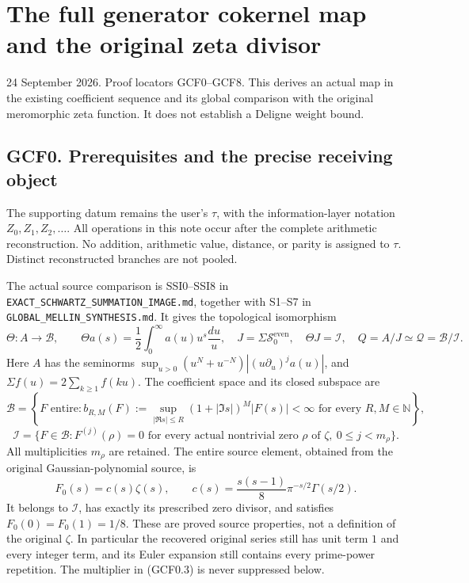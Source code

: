 \section{The full generator cokernel map and the original zeta
divisor}\label{the-full-generator-cokernel-map-and-the-original-zeta-divisor}

24 September 2026. Proof locators GCF0--GCF8. This derives an actual map
in the existing coefficient sequence and its global comparison with the
original meromorphic zeta function. It does not establish a Deligne
weight bound.

\subsection{GCF0. Prerequisites and the precise receiving
object}\label{gcf0.-prerequisites-and-the-precise-receiving-object}

The supporting datum remains the user's \(\tau\), with the
information-layer notation \(Z_0,Z_1,Z_2,\ldots\). All operations in
this note occur after the complete arithmetic reconstruction. No
addition, arithmetic value, distance, or parity is assigned to \(\tau\).
Distinct reconstructed branches are not pooled.

The actual source comparison is SSI0--SSI8 in
\nolinkurl{EXACT_SCHWARTZ_SUMMATION_IMAGE.md}, together with S1--S7 in
\texttt{GLOBAL\_MELLIN\_SYNTHESIS.md}. It gives the topological
isomorphism \[
\Theta:A\longrightarrow\mathcal B,\qquad
\Theta a(s)=\frac12\int_0^\infty a(u)u^s\frac{du}{u},
\quad J=\Sigma\mathcal S_0^{\mathrm{even}},\quad
\Theta J=\mathcal I,\quad Q=A/J\simeq\mathcal Q=\mathcal B/\mathcal I.
\tag{GCF0.1}
\] Here \(A\) has the seminorms
\(\sup_{u>0}(u^N+u^{-N})|(u\partial_u)^ja(u)|\), and
\(\Sigma f(u)=2\sum_{k\ge1}f(ku)\). The coefficient space and its closed
subspace are \[
\mathcal B=\left\{F\text{ entire}: b_{R,M}(F):=
\sup_{|\Re s|\le R}(1+|\Im s|)^M|F(s)|<\infty
\text{ for every }R,M\in\mathbb N\right\},
\] \[
\mathcal I=\{F\in\mathcal B:F^{(j)}(\rho)=0
\text{ for every actual nontrivial zero }\rho\text{ of }\zeta,
\ 0\le j<m_\rho\}.
\tag{GCF0.2}
\] All multiplicities \(m_\rho\) are retained. The entire source
element, obtained from the original Gaussian-polynomial source, is \[
F_0(s)=c(s)\zeta(s),\qquad
c(s)=\frac{s(s-1)}8\pi^{-s/2}\Gamma(s/2).
\tag{GCF0.3}
\] It belongs to \(\mathcal I\), has exactly its prescribed zero
divisor, and satisfies \(F_0(0)=F_0(1)=1/8\). These are proved source
properties, not a definition of the original \(\zeta\). In particular
the recovered original series still has unit term \(1\) and every
integer term, and its Euler expansion still contains every prime-power
repetition. The multiplier in (GCF0.3) is never suppressed below.

